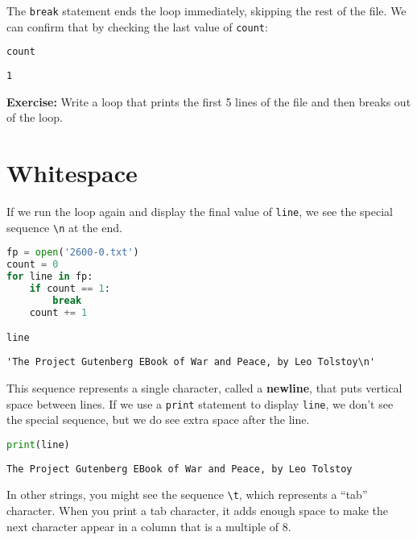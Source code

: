 The \passthrough{\lstinline!break!} statement ends the loop immediately,
skipping the rest of the file. We can confirm that by checking the last
value of \passthrough{\lstinline!count!}:

\begin{lstlisting}[language=Python,style=source]
count
\end{lstlisting}

\begin{lstlisting}[style=output]
1
\end{lstlisting}

\textbf{Exercise:} Write a loop that prints the first 5 lines of the
file and then breaks out of the loop.

\hypertarget{whitespace}{%
\section{Whitespace}\label{whitespace}}

If we run the loop again and display the final value of
\passthrough{\lstinline!line!}, we see the special sequence
\passthrough{\lstinline!\\n!} at the end.

\begin{lstlisting}[language=Python,style=source]
fp = open('2600-0.txt')
count = 0
for line in fp:
    if count == 1:
        break
    count += 1

line
\end{lstlisting}

\begin{lstlisting}[style=output]
'The Project Gutenberg EBook of War and Peace, by Leo Tolstoy\n'
\end{lstlisting}

This sequence represents a single character, called a \textbf{newline},
that puts vertical space between lines. If we use a
\passthrough{\lstinline!print!} statement to display
\passthrough{\lstinline!line!}, we don't see the special sequence, but
we do see extra space after the line.

\begin{lstlisting}[language=Python,style=source]
print(line)
\end{lstlisting}

\begin{lstlisting}[style=output]
The Project Gutenberg EBook of War and Peace, by Leo Tolstoy
\end{lstlisting}

In other strings, you might see the sequence
\passthrough{\lstinline!\\t!}, which represents a ``tab'' character.
When you print a tab character, it adds enough space to make the next
character appear in a column that is a multiple of 8.

